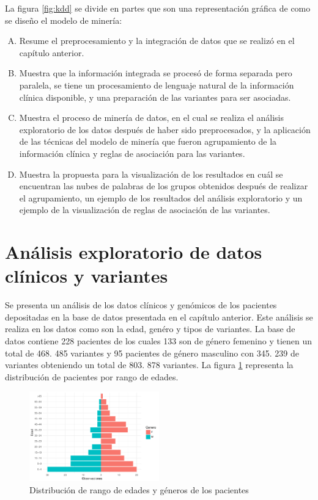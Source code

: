  La figura \ref{fig:kdd} se divide en partes que son una representación gráfica de como se diseño el modelo de minería:
 
 \begin{enumerate}[A)]
 	\item Resume el preprocesamiento  y la integración de datos que se realizó en el capítulo anterior. 
 	\item Muestra que la información integrada se procesó de forma separada pero paralela, se tiene un procesamiento de lenguaje natural de la información clínica disponible, y una preparación de las variantes para ser asociadas. 
 	\item Muestra el proceso de minería de datos, en el cual se realiza el análisis exploratorio de los datos después de haber sido preprocesados, y la aplicación de las técnicas del modelo de minería que fueron agrupamiento de la información clínica y reglas de asociación para las variantes. 
 	\item  Muestra la propuesta para la visualización de los resultados en cuál se encuentran las nubes de palabras de los grupos obtenidos después de realizar el agrupamiento, un ejemplo de los resultados del análisis exploratorio y un ejemplo de la visualización de reglas de asociación de las variantes. 
 \end{enumerate}
 

\section{Análisis exploratorio de datos clínicos y variantes}

Se presenta un análisis de los datos clínicos  y genómicos de los pacientes depositadas en la base de datos presentada en el capítulo anterior. Este análisis se realiza en los datos como son la edad, genéro y tipos de variantes. La base de datos contiene 228 pacientes de los cuales 133 son de género femenino y tienen un total de 468. 485 variantes y 95 pacientes de género masculino con 345. 239 de variantes obteniendo  un total de 803. 878 variantes. La  figura \ref{fig:general} representa la distribución de pacientes por rango de edades. \\

\begin{figure}[h]
	\centering
	\includegraphics[width=0.5\textwidth]{Kap4/general}
	\caption{Distribución de rango de edades y géneros de los pacientes}
	\label{fig:general}
\end{figure}


